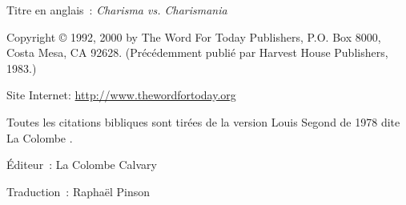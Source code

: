 \newpage
\mbox{}
\vfill
\noindent Titre en anglais~: \emph{Charisma vs. Charismania}

\noindent Copyright \copyright{} 1992, 2000 by The Word For Today Publishers, P.O. Box 8000, \\
Costa Mesa, CA 92628. (Précédemment publié par Harvest House Publishers, 1983.) \\


\noindent Site Internet: \url{http://www.thewordfortoday.org}

\noindent Toutes les citations bibliques sont tirées de la version Louis Segond de 1978
 dite \og La Colombe \fg{}.

\noindent Éditeur~: La Colombe Calvary

\noindent Traduction~: Raphaël Pinson

